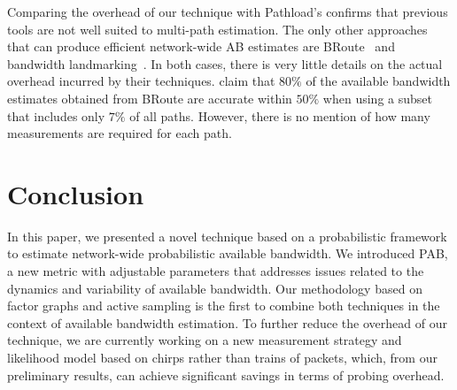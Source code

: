 \documentclass[final,5p,times,twocolumn]{elsarticle}
\begin{document}
Comparing the overhead of our technique with Pathload's confirms that previous tools are not well suited to multi-path estimation.  The only other approaches that can produce efficient network-wide AB estimates are BRoute~\cite{hu:05} and bandwidth landmarking~\cite{man:07bandwidth}.  In both cases, there is very little details on the actual overhead incurred by their techniques.  \citet{hu:05} claim that $80\%$ of the available bandwidth estimates obtained from BRoute are accurate within $50\%$ when using a subset that includes only $7\%$ of all paths.  However, there is no mention of how many measurements are required for each path.

\section{Conclusion}
\label{sec:conclusion}

In this paper, we presented a novel technique based on a probabilistic framework to estimate network-wide probabilistic available bandwidth.  We introduced PAB, a new metric with adjustable parameters that addresses issues related to the dynamics and variability of available bandwidth.  Our methodology based on factor graphs and active sampling is the first to combine both techniques in the context of available bandwidth estimation.  To further reduce the overhead of our technique, we are currently working on a new measurement strategy and likelihood model based on chirps rather than trains of packets, which, from our preliminary results, can achieve significant savings in terms of probing overhead.



\end{document}
